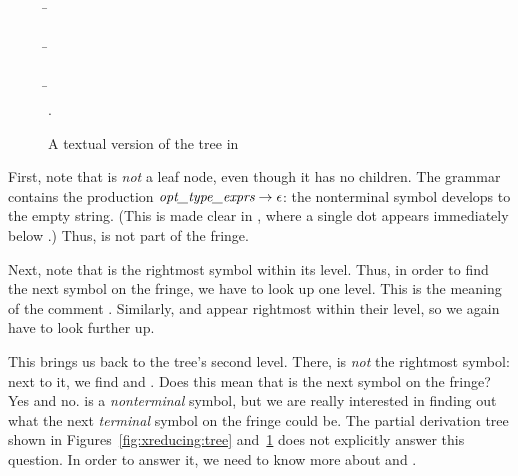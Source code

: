 \documentclass[onecolumn,11pt,nocopyrightspace,preprint]{sigplanconf}
\begin{document}
\begin{figure}
\begin{center}
\begin{tabbing}
\=  \\
\>   
 \\
\>   \= 
 \\
\> \>   \\
\> \>  \=   \\
\> \> \> .
\end{tabbing}
\end{center}
\caption{A textual version of the tree in }
\label{fig:xreducing:text}
\end{figure}

First, note that  is \emph{not} a leaf node, even though
it has no children. The grammar contains the production $\textit{opt\_type\_exprs}
\rightarrow \epsilon$: the nonterminal symbol  develops
to the empty string. (This is made clear in , where a
single dot appears immediately below .) Thus,
 is not part of the fringe.

Next, note that  is the rightmost symbol within its
level. Thus, in order to find the next symbol on the fringe, we have to look
up one level. This is the meaning of the comment . Similarly,  and  appear
rightmost within their level, so we again have to look further up.

This brings us back to the tree's second level. There,  is \emph{not}
the rightmost symbol: next to it, we find  and . Does
this mean that  is the next symbol on the fringe? Yes and no.
 is a \emph{nonterminal} symbol, but we are really interested in finding
out what the next \emph{terminal} symbol on the fringe could be. The partial
derivation tree shown in Figures~\ref{fig:xreducing:tree}
and~\ref{fig:xreducing:text} does not explicitly answer this question. In
order to answer it, we need to know more about  and .
\end{document}
